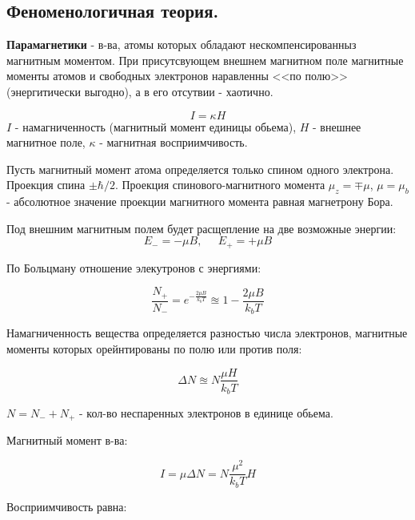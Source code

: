 \documentclass[a4paper]{article}
\begin{document}
\subsection{Феноменологичная теория.}

\textbf{Парамагнетики} - в-ва, атомы которых обладают нескомпенсированныз магнитным моментом. При присутсвующем внешнем магнитном поле магнитные моменты атомов и свободных электронов
наравленны <<по полю>> (энергитически выгодно), а в его отсутвии - хаотично. \par 
\begin{equation}
    I = \kappa H
\end{equation}
$I$ - намагниченность (магнитный момент единицы обьема), $H$ - внешнее магнитное поле, $\kappa$ - магнитная восприимчивость. \par 

Пусть магнитный момент атома определяется только спином одного электрона. Проекция спина  $\pm \hbar/2$. Проекция спинового-магнитного момента 
$\mu_z = \mp \mu$, $\mu = \mu_b$ - абсолютное значение проекции магнитного момента равная магнетрону Бора. \par 

Под внешним магнитным полем будет расщепление на две возможные энергии:
\begin{equation}
    E_- = - \mu B, \;\;\;\;\; E_+ = +\mu B
\end{equation}

По Больцману отношение элекутронов с энергиями:

\begin{equation}
    \frac{N_+}{N_-} = e^{-\frac{2 \mu B}{k_bT}} \approxeq 1 - \frac{2\mu B}{k_b T}
\end{equation}

Намагниченность вещества определяется разностью числа электронов, магнитные моменты которых орейнтированы по полю или против поля:

\begin{equation}
    \Delta N \approxeq N \frac{\mu H}{k_b T}
\end{equation}

$N = N_- + N_+$ - кол-во неспаренных электронов в единице обьема. 

Магнитный момент в-ва:

\begin{equation}
    I = \mu \Delta N = N \frac{\mu^2}{k_bT}H
\end{equation}

Восприимчивость равна:
\end{document}
